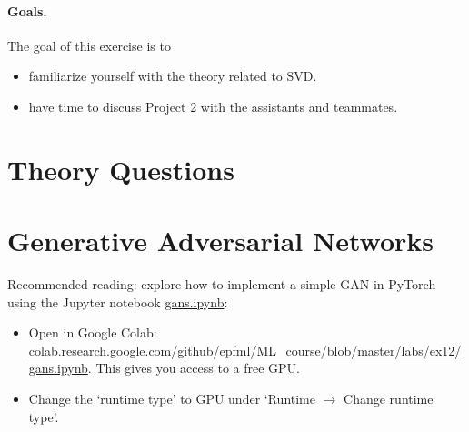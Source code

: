 \documentclass{../tex_import/ETHuebung_english}
\begin{document}


\paragraph{Goals.}
The goal of this exercise is to

\begin{itemize}
	\item familiarize yourself with the theory related to SVD.
	\item have time to discuss Project 2 with the assistants and teammates.
\end{itemize}


\section{Theory Questions}



\section{Generative Adversarial Networks}
Recommended reading: explore how to implement a simple GAN in PyTorch using the Jupyter notebook \href{https://github.com/epfml/ML_course/tree/master/labs/ex12/gans.ipynb}{gans.ipynb}:

\begin{itemize}
	\item Open in Google Colab: \href{https://colab.research.google.com/github/epfml/ML_course/blob/master/labs/ex12/gans.ipynb}{colab.research.google.com/github/epfml/ML\_course/blob/master/labs/ex12/gans.ipynb}. This gives you access to a free GPU.
	\item Change the `runtime type' to GPU under `Runtime $\to$ Change runtime type'.
\end{itemize}
\end{document}
